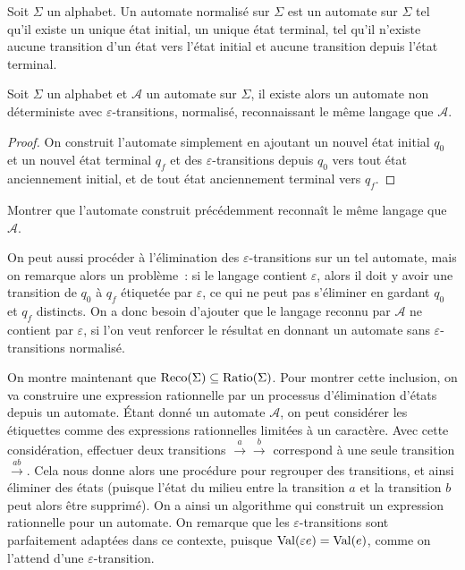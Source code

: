 \begin{definition}
  Soit $\Sigma$ un alphabet. Un automate normalisé sur $\Sigma$ est un automate
  sur $\Sigma$ tel qu'il existe un unique état initial, un unique état terminal,
  tel qu'il n'existe aucune transition d'un état vers l'état initial et aucune
  transition depuis l'état terminal.
\end{definition}

\begin{proposition}
  Soit $\Sigma$ un alphabet et $\mathcal A$ un automate sur $\Sigma$, il existe
  alors un automate non déterministe avec $\varepsilon$-transitions, normalisé,
  reconnaissant le même langage que $\mathcal A$.
\end{proposition}

\begin{proof}
  On construit l'automate simplement en ajoutant un nouvel état initial $q_0$
  et un nouvel état terminal $q_f$ et des $\varepsilon$-transitions depuis
  $q_0$ vers tout état anciennement initial, et de tout état anciennement
  terminal vers $q_f$.
\end{proof}

\begin{exercise}
  Montrer que l'automate construit précédemment reconnaît le même langage que
  $\mathcal A$.
\end{exercise}

On peut aussi procéder à l'élimination des $\varepsilon$-transitions sur un
tel automate, mais on remarque alors un problème~: si le langage contient
$\varepsilon$, alors il doit y avoir une transition de $q_0$ à $q_f$ étiquetée
par $\varepsilon$, ce qui ne peut pas s'éliminer en gardant $q_0$ et $q_f$
distincts. On a donc besoin d'ajouter que le langage reconnu par $\mathcal A$
ne contient par $\varepsilon$, si l'on veut renforcer le résultat en donnant un
automate sans $\varepsilon$-transitions normalisé.

On montre maintenant que $\operatorname{Reco}(\Sigma)\subseteq \operatorname{Ratio}(\Sigma)$. Pour montrer
cette inclusion, on va construire une expression rationnelle par un processus
d'élimination d'états depuis un automate. \'Etant donné un automate
$\mathcal A$, on peut considérer les étiquettes comme des expressions
rationnelles limitées à un caractère. Avec cette considération, effectuer deux
transitions $\xrightarrow a \xrightarrow b$ correspond à une seule transition
$\xrightarrow{ab}$. Cela nous donne alors une procédure pour regrouper des
transitions, et ainsi éliminer des états (puisque l'état du milieu entre la
transition $a$ et la transition $b$ peut alors être supprimé). On a ainsi un
algorithme qui construit un expression rationnelle pour un automate. On remarque
que les $\varepsilon$-transitions sont parfaitement adaptées dans ce contexte,
puisque $\operatorname{Val}(\varepsilon e) = \operatorname{Val}(e)$, comme on l'attend d'une
$\varepsilon$-transition.

